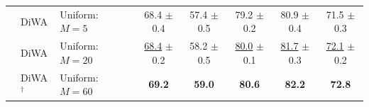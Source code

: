 \begin{table}[h]
{\begin{tabular}{llll|ccccc}
             & DiWA                                               & Uniform: $M=5$            &                                                & 68.4 $\pm$ 0.4             & 57.4 $\pm$ 0.5   & 79.2 $\pm$ 0.2             & 80.9 $\pm$ 0.4             & 71.5 $\pm$ 0.3             \\
             & DiWA                                               & Uniform: $M=20$           &                                                & \underline{68.4} $\pm$ 0.2 & 58.2 $\pm$ 0.5   & \underline{80.0} $\pm$ 0.1 & \underline{81.7} $\pm$ 0.3 & \underline{72.1} $\pm$ 0.2 \\
             & DiWA$^{\dagger}$                                   & Uniform: $M=60$           &                                                & \textbf{69.2}              & \textbf{59.0}    & \textbf{80.6}              & \textbf{82.2}              & \textbf{72.8}              \\
            \bottomrule
        \end{tabular}}
\end{table}


